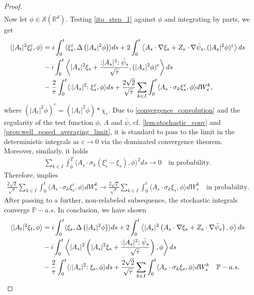 \documentclass[a4paper,10pt]{amsart}
\newcommand{\R}{\mathbb{R}}
\renewcommand{\epsilon}{\varepsilon}
\newcommand{\wick}[1]{:\mathrel{#1}:}
\theoremstyle{remark}
\numberwithin{equation}{section}
\begin{document}
\begin{proof}
\begin{align}
   \end{align}
   Now let $\phi \in \mathscr{S}(\R^d)$. Testing \eqref{ito_step_1} against $\phi$ and integrating by parts, we get
   \begin{align}\label{ito_step_3}
     \langle |A_t|^2\xi^{\epsilon}_t,\phi\rangle&=i\int_0^t\langle\xi^{\epsilon}_s,\Delta\left(|A_s|^2 \phi\right)\rangle ds  +2\int_0^t\left\langle A_s\cdot\nabla\xi_s+Z_s \cdot\nabla \bar{\psi}_s, (|A_s|^2\phi)^{\epsilon}\right\rangle ds \notag
     \\& -i\int_0^t\left\langle |A_s|^2\xi_s+\frac{\wick{|A_s|^2}\bar{\psi}_s}{\sqrt{\tau}}, (|A_s|^2\phi)^{\epsilon}\right\rangle ds\notag\\ & -\frac{2}{\tau}\int_0^t \langle\wick{|A_s|^2}\xi^{\epsilon}_s,\phi\rangle ds+\frac{2\sqrt{2}}{\sqrt{\tau}}\sum_{k\in I }\int_0^t  \langle A_s\cdot \sigma_k\xi^{\epsilon}_s, \phi\rangle dW^k_s,
   \end{align}
   where $(|A_t|^2\phi)^{\epsilon}=(|A_t|^2\phi)\ast \chi_{\epsilon}.$ Due to \eqref{convergence_convolution} and the regularity of the test function $\phi$, $A$ and $\bar{\psi}$, cf. \cref{lem:stochastic_conv} and \cref{prop:well_posed_averaging_limit}, it is standard to pass to the limit in the deterministic integrals as $\epsilon\rightarrow 0$ via the dominated convergence theorem.
   Moreover, similarly, it holds
   \begin{align*}
      \sum_{k\in I }\int_0^T\langle A_s\cdot \sigma_k(\xi^{\epsilon}_s-\xi_s), \phi\rangle^2ds \rightarrow 0\quad\mbox{in probability.}
   \end{align*}
   Therefore, \cite[Lemma 4.3]{bagnara2025no} implies 
   \begin{align*}
       \frac{2\sqrt{2}}{\sqrt{\tau}}\sum_{k\in I }\int_0^t  \langle A_s\cdot \sigma_k\xi^{\epsilon}_s, \phi\rangle dW^k_s\rightarrow \frac{2\sqrt{2}}{\sqrt{\tau}}\sum_{k\in I }\int_0^t  \langle A_s\cdot \sigma_k\xi_s, \phi\rangle dW^k_s \quad\mbox{in probability.}
   \end{align*}
   After passing to a further, non-relabeled subsequence, the stochastic
   integrals converge $\mathbb{P}-a.s.$ In conclusion, we have shown
    \begin{align}\label{ito_step_4}
     \langle |A_t|^2\xi_t,\phi\rangle&=i\int_0^t\langle\xi_s,\Delta\left(|A_s|^2 \phi\right)\rangle ds+2\int_0^t\left\langle |A_s|^2 \left(A_s\cdot\nabla\xi_s+Z_s \cdot\nabla \bar{\psi}_s\right), \phi\right\rangle ds \notag
     \\& -i\int_0^t\left\langle |A_s|^2\left( |A_s|^2\xi_s+\frac{\wick{|A_s|^2}\bar{\psi}_s}{\sqrt{\tau}}\right), \phi\right\rangle ds\notag\\ & -\frac{2}{\tau}\int_0^t \langle\wick{|A_s|^2}\xi_s,\phi\rangle ds+\frac{2\sqrt{2}}{\sqrt{\tau}}\sum_{k\in I }\int_0^t  \langle A_s\cdot \sigma_k\xi_s, \phi\rangle dW^k_s\quad \mathbb{P}-a.s.

\end{align}
\end{proof}
\end{document}

